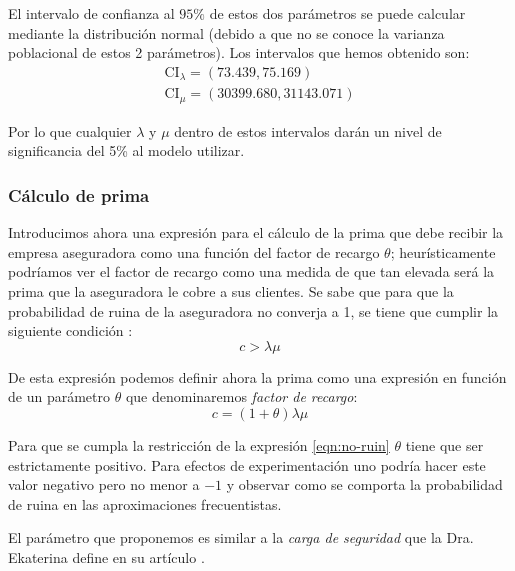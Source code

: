 \documentclass[journal]{IEEEtran}
\begin{document}
                El intervalo de confianza al $95\%$ de estos dos parámetros se puede calcular mediante la distribución normal (debido a que no se conoce la varianza poblacional de estos 2 parámetros). Los intervalos que hemos obtenido son:
                \begin{gather*}
                    \text{CI}_{\lambda} = \left(73.439, 75.169\right)\\
                    \text{CI}_{\mu} = \left(30399.680, 31143.071\right)
                \end{gather*}

                Por lo que cualquier $\lambda$ y $\mu$ dentro de estos intervalos darán un nivel de significancia del 5\% al modelo utilizar.

            \subsubsection{Cálculo de prima}

                Introducimos ahora una expresión para el cálculo de la prima que debe recibir la empresa aseguradora como una función del factor de recargo $\theta$; heurísticamente podríamos ver el factor de recargo como una medida de que tan elevada será la prima que la aseguradora le cobre a sus clientes. Se sabe que para que la probabilidad de ruina de la aseguradora no converja a 1, se tiene que cumplir la siguiente condición \cite{rolski2009stochastic}:
                \begin{equation}\label{eqn:no-ruin}
                    c > \lambda \mu
                \end{equation}

                De esta expresión podemos definir ahora la prima como una expresión en función de un parámetro $\theta$ que denominaremos \emph{factor de recargo}:
                \begin{equation}\label{eqn:def-theta}
                    c = (1 + \theta) \lambda \mu
                \end{equation}
                
                Para que se cumpla la restricción de la expresión \ref{eqn:no-ruin} $\theta$ tiene que ser estrictamente positivo. Para efectos de experimentación uno podría hacer este valor negativo pero no menor a $-1$ y observar como se comporta la probabilidad de ruina en las aproximaciones frecuentistas.

                El parámetro que proponemos es similar a la \emph{carga de seguridad} que la Dra. Ekaterina define en su artículo \cite{ekaterina}.
\end{document}
